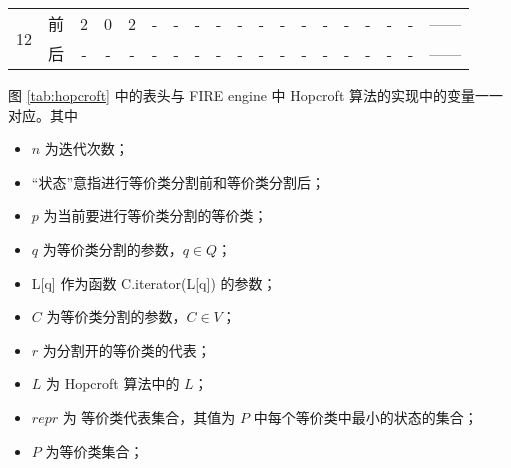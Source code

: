 \begin{table}[!htbp]
\begin{tabular}{ccccccc|cccccccccc|cl}
        \multirow{2}{*}{12}& 前 & 2 & 0 & 2 & - & -  & - & - & - & - & - & - & - & - & - & - & -             & ------ \\
                           & 后 & - & - & - & - & -  & - & - & - & - & - & - & - & - & - & - & -             & ------ \\
        \bottomrule%
    \end{tabular}
\end{table}

图 \ref{tab:hopcroft} 中的表头与 FIRE engine 中 Hopcroft 算法的实现中的变量一一对应。其中
\begin{itemize}
    \item $n$ 为迭代次数；
    \item “状态”意指进行等价类分割前和等价类分割后；
    \item $p$ 为当前要进行等价类分割的等价类；
    \item $q$ 为等价类分割的参数，$q \in Q$；
    \item L[q] 作为函数 C.iterator(L[q]) 的参数；
    \item $C$ 为等价类分割的参数，$C \in V$；
    \item $r$ 为分割开的等价类的代表；
    \item $L$ 为 Hopcroft 算法中的 $L$；
    \item $repr$ 为 等价类代表集合，其值为 $P$ 中每个等价类中最小的状态的集合；
    \item $P$ 为等价类集合；
\end{itemize}